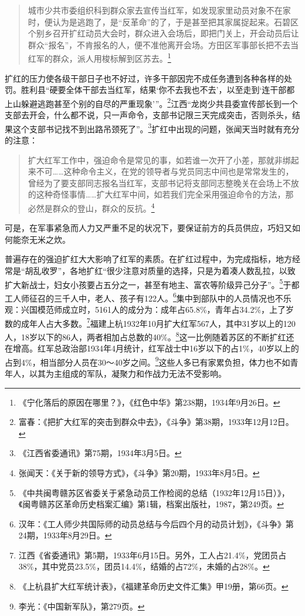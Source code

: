\begin{quote}

城市少共市委组织科到群众家去宣传当红军，如发现家里动员对象不在家时，便认为是逃跑了，是“反革命”的了，于是甚至把其家属捉起来。石碧区个别乡召开扩红动员大会时，群众进入会场后，即把门关上，开会动员后让群众“报名”，不肯报名的人，便不准他离开会场。方田区军事部长把不去当红军的群众，派人用梭标解到区苏去。\footnote{《宁化落后的原因在哪里？》，《红色中华》第238期，1934年9月26日。}
\end{quote}


扩红的压力使各级干部日子也不好过，许多干部因完不成任务遭到各种各样的处罚。胜利县“硬要全体干部去当红军，结果‘你不去我也不去’，以至走到‘连干部都上山躲避逃跑甚至个别的自尽的严重现象’”。\footnote{富春：《把扩大红军的突击到群众中去》，《斗争》第38期，1933年12月12日。}江西“龙岗少共县委宣传部长到一个支部去开会，什么都不说，只一声命令，支部书记限三天完成突击，否则杀头，结果这个支部书记找不到出路吊颈死了”。\footnote{《江西省委通讯》第75期，1934年3月5日。}扩红中出现的问题，张闻天当时就有充分的注意：

\begin{quote}

扩大红军工作中，强迫命令是常见的事，如若谁一次开了小差，那就非绑起来不可……这种命令主义，在党的领导者与党员同志中间也是常常发生的，曾经为了要支部同志报名当红军，支部书记将支部同志整晚关在会场上不放的这种奇怪事情……扩大红军中间，如若我们完全采用强迫命令的方法，那必然是群众的登山，群众的反抗。\footnote{张闻天：《关于新的领导方式》，《斗争》第20期，1933年8月5日。}
\end{quote}


可是，在军事紧急而人力又严重不足的状况下，要保证前方的兵员供应，巧妇又如何能奈无米之炊。


普遍存在的强迫扩红大大影响了红军的素质。在扩红过程中，为完成指标，地方经常是“胡乱收罗”，各地扩红“很少注意对质量的选择，只是为着凑人数乱拉，以致扩大新战士，妇女小孩要占五分之一，甚至有地主、富农等阶级异己分子”。\footnote{《中共闽粤赣苏区省委关于紧急动员工作检阅的总结（1932年12月15日）》，《闽粤赣苏区革命历史档案汇编》第1辑，档案出版社，1987，第249页。}于都工人师征召的三千人中，老人、孩子有122人。\footnote{汉年：《工人师少共国际师的动员总结与今后四个月的动员计划》，《斗争》第24期，1933年8月29日。}集中到部队中的人员情况也不乐观：兴国模范师成立时，5161人的成分为：成年占65.8\%，青年占34.2\%，上了岁数的成年人占大多数。\footnote{江西《省委通讯》第5期，1933年6月15日。另外，工人占21.4\%，党团员占38\%，其中党员23.5\%，团员14.4\%，结婚的占72\%，未婚的占28\%。}福建上杭1932年10月扩大红军567人，其中31岁以上的120人，18岁以下的86人，两者相加占总数的40\%。\footnote{《上杭县扩大红军统计表》，《福建革命历史文件汇集》甲19册，第66页。}这一比例随着苏区的不断扩红还在增高。红军总政治部1934年4月统计，红军战士中16岁以下的占1\%，40岁以上的占到4\%，相当部分人员在30～40岁之间。\footnote{李光：《中国新军队》，第279页。}这些人多已有家累负担，体力也不如青年人，以其为主组成的军队，凝聚力和作战力无法不受影响。



